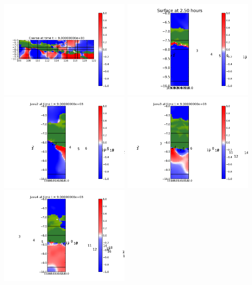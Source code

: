 \documentclass[11pt]{article}
\begin{document}
\vskip 10pt 
\includegraphics[width=0.475\textwidth]{frame0010fig0.png}
\includegraphics[width=0.475\textwidth]{frame0010fig15.png}
\vskip 10pt 
\includegraphics[width=0.475\textwidth]{frame0010fig25.png}
\includegraphics[width=0.475\textwidth]{frame0010fig20.png}
\vskip 10pt 
\includegraphics[width=0.475\textwidth]{frame0010fig30.png}
\end{document}
